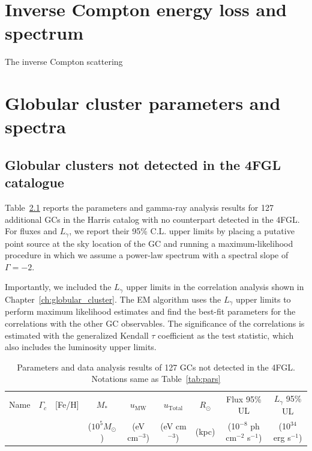 \documentclass[doublespace,nopageskip]{VTthesis} %
\begin{document}
\begin{appendices}

\chapter{Inverse Compton energy loss and spectrum}\label{app:IC}

The inverse Compton scattering

\chapter{Globular cluster parameters and spectra} \label{app:glbcs}
  
\section{Globular clusters not detected in the 4FGL catalogue}\label{appx:nodetect}

Table~\ref{tab:nondetect} reports the parameters and gamma-ray analysis results for 127 additional GCs in the Harris catalog with no counterpart detected in the 4FGL. For fluxes and $L_\gamma$, we report their 95\% C.L. upper limits by placing a putative point source at the sky location of the GC and running a maximum-likelihood procedure in which we assume a power-law spectrum with a spectral slope of $\Gamma = -2$.

Importantly, we included the $L_\gamma$ upper limits in the correlation analysis shown in Chapter~\ref{ch:globular_cluster}. The EM algorithm uses the $L_\gamma$ upper limits to perform maximum likelihood estimates and find the best-fit parameters for the correlations with the other GC observables. The significance of the correlations is estimated with the generalized Kendall $\tau$ coefficient as the test statistic, which also includes the luminosity upper limits. 

\begin{center}
\scriptsize
\begin{longtable}{lcccccccr}
\caption{Parameters and data analysis results of 127 GCs not detected in the 4FGL. Notations same as Table~\ref{tab:pars}}\label{tab:nondetect} \\
\hline \multicolumn{1}{c}{{Name}} & \multicolumn{1}{c}{{$\Gamma_c$}} & \multicolumn{1}{c}{{[Fe/H]}} & \multicolumn{1}{c}{{$M_*$}} & \multicolumn{1}{c}{{$u_\text{MW}$}} & \multicolumn{1}{c}{{$u_\text{Total}$}} & \multicolumn{1}{c}{{$R_\odot$}} & \multicolumn{1}{c}{{Flux 95\% UL}} & \multicolumn{1}{c}{{$L_\gamma$ 95\% UL}}\\ 
\multicolumn{1}{c}{{}} & \multicolumn{1}{c}{{}} & \multicolumn{1}{c}{{}} & \multicolumn{1}{c}{{($10^5 M_\odot$)}} & \multicolumn{1}{c}{{(eV cm$^{-3}$)}} & \multicolumn{1}{c}{{(eV cm$^{-3}$)}} & \multicolumn{1}{c}{{(kpc)}} & \multicolumn{1}{c}{{(10$^{-8}$ ph cm$^{-2}$ s$^{-1}$)}} & \multicolumn{1}{c}{{(10$^{34}$ erg s$^{-1}$)}}\\ \hline
\endfirsthead


\end{longtable}
\end{center}
\end{appendices}
\end{document}
